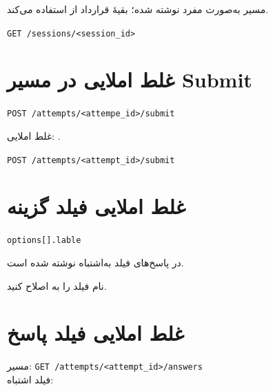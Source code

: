 \documentclass[a4paper,11pt]{article}
\newcommand{\apipath}[1]{\texttt{#1}}
\begin{document}
\begin{problembox}
مسیر به‌صورت مفرد نوشته شده؛ بقیهٔ قرارداد از  استفاده می‌کند.
\end{problembox}

\begin{solutionbox}
\apipath{GET /sessions/<session\_id>}
\end{solutionbox}

\section{غلط املایی در مسیر Submit}

\begin{apibox}
\apipath{POST /attempts/<attempe\_id>/submit}
\end{apibox}

\begin{problembox}
غلط املایی: .
\end{problembox}

\begin{solutionbox}
\apipath{POST /attempts/<attempt\_id>/submit}
\end{solutionbox}

\section{غلط املایی فیلد گزینه}

\begin{apibox}
\apipath{options[].lable}
\end{apibox}

\begin{problembox}
در پاسخ‌های  فیلد به‌اشتباه  نوشته شده است.
\end{problembox}

\begin{solutionbox}
نام فیلد را به  اصلاح کنید.
\end{solutionbox}

\section{غلط املایی فیلد پاسخ}

\begin{apibox}
\noindent مسیر: \apipath{GET /attempts/<attempt\_id>/answers}\\
فیلد اشتباه: 
\end{apibox}
\end{document}
